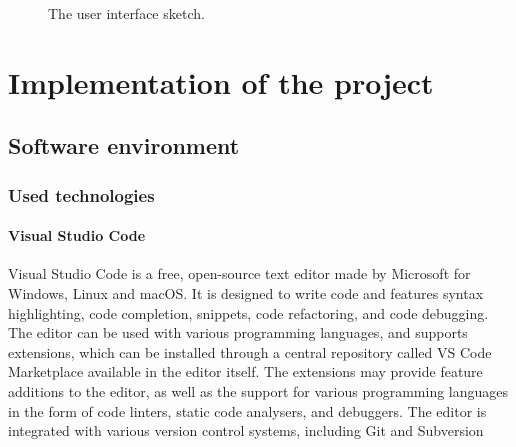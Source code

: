 \documentclass[english,bachelors,forcepolishlogotype]{wizthesis}
\newcommand{\thisproject}{Parser-parser}
\begin{document}
\begin{figure}[H]
  \centering
  \caption{The user interface sketch.}
  \label{fig:interface-prototype}
\end{figure}

\chapter{Implementation of the project} \label{ch:implementation-of-the-project}

\section{Software environment}

\subsection{Used technologies} \label{sbs:used-technologies}

\subsubsection*{Visual Studio Code}

Visual Studio Code \cite{vs-code} is a free, open-source text editor made by
Microsoft for Windows, Linux and macOS. It is designed to write code and
features syntax highlighting, code completion, snippets, code refactoring, and
code debugging. The editor can be used with various programming languages, and
supports extensions, which can be installed through a central repository called
VS Code Marketplace available in the editor itself. The extensions may provide
feature additions to the editor, as well as the support for various programming
languages in the form of code linters, static code analysers, and debuggers. The
editor is integrated with various version control systems, including Git and
Subversion
\end{document}
